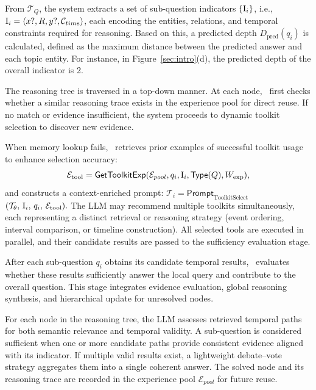 From $\mathcal{T}_Q$, the system extracts a set of sub-question indicators $\{\mathrm{I}_i\}$, i.e., $\mathrm{I}_i = \langle x?, R, y?, \mathcal{C}_{time}\rangle$,
each encoding the entities, relations, and temporal constraints required for reasoning.  
Based on this, a predicted depth $D_{\text{pred}}(q_i)$ is calculated, defined as the maximum distance between the predicted answer and each topic entity.
For instance, in Figure~\ref{sec:intro}(d), the predicted depth of the overall indicator is 2.


The reasoning tree is traversed in a top-down manner.  
At each node, \mot\ first checks whether a similar reasoning trace exists in the experience pool for direct reuse. 
If no match or evidence insufficient, the system proceeds to dynamic toolkit selection to discover new evidence.

When memory lookup fails, \mot\ retrieves prior examples of successful toolkit usage to enhance selection accuracy:
\[
\mathcal{E}_{\text{tool}} = \textsf{GetToolkitExp}(\mathcal{E}_{pool}, q_i, \mathrm{I}_i, \textsf{Type}(Q), W_{\text{exp}}),
\]
and constructs a context-enriched prompt:
$
\mathcal{T}_i = 
\textsf{Prompt}_{\text{ToolkitSelect}}$ $
(\mathcal{T}_\theta,\, \mathrm{I}_i,\, q_i,\, \mathcal{E}_{\text{tool}}).
$
The LLM may recommend multiple toolkits simultaneously, 
each representing a distinct retrieval or reasoning strategy (\eg event ordering, interval comparison, or timeline construction).  
All selected tools are executed in parallel, and their candidate results are passed to the sufficiency evaluation stage.

After each sub-question $q_i$ obtains its candidate temporal results, 
\mot\ evaluates whether these results sufficiently answer the local query and contribute to the overall question. 
This stage integrates evidence evaluation, global reasoning synthesis, and hierarchical update for unresolved nodes.

For each node in the reasoning tree, the LLM assesses retrieved temporal paths for both semantic relevance and temporal validity. 
A sub-question is considered sufficient when one or more candidate paths provide consistent evidence aligned with its indicator. 
If multiple valid results exist, a lightweight debate–vote strategy aggregates them into a single coherent answer. 
The solved node and its reasoning trace are recorded in the experience pool $\mathcal{E}_{pool}$ for future reuse.



